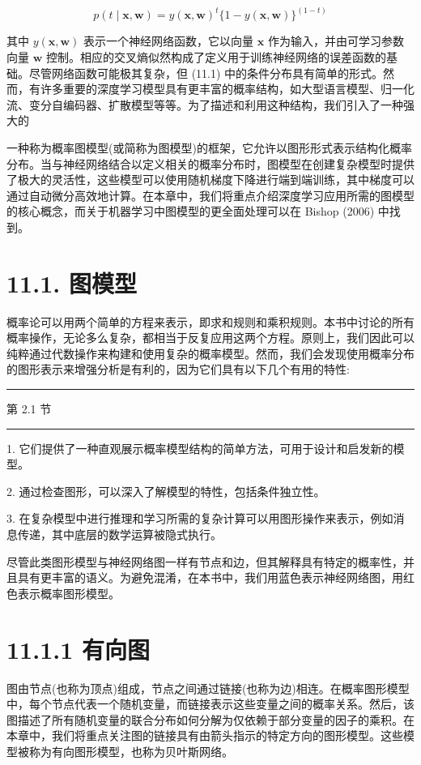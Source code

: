 \documentclass[10pt]{report}
\newcommand{\HRule}{\begin{center}\rule{0.9\linewidth}{0.2mm}\end{center}}
\begin{document}
\[
p\left( {t \mid  \mathbf{x},\mathbf{w}}\right)  = y{\left( \mathbf{x},\mathbf{w}\right) }^{t}\{ 1 - y\left( {\mathbf{x},\mathbf{w}}\right) {\} }^{\left( 1 - t\right) } \tag{11.1}
\]

其中 \(y\left( {\mathbf{x},\mathbf{w}}\right)\) 表示一个神经网络函数，它以向量 \(\mathbf{x}\) 作为输入，并由可学习参数向量 \(\mathbf{w}\) 控制。相应的交叉熵似然构成了定义用于训练神经网络的误差函数的基础。尽管网络函数可能极其复杂，但 (11.1) 中的条件分布具有简单的形式。然而，有许多重要的深度学习模型具有更丰富的概率结构，如大型语言模型、归一化流、变分自编码器、扩散模型等等。为了描述和利用这种结构，我们引入了一种强大的

一种称为概率图模型(或简称为图模型)的框架，它允许以图形形式表示结构化概率分布。当与神经网络结合以定义相关的概率分布时，图模型在创建复杂模型时提供了极大的灵活性，这些模型可以使用随机梯度下降进行端到端训练，其中梯度可以通过自动微分高效地计算。在本章中，我们将重点介绍深度学习应用所需的图模型的核心概念，而关于机器学习中图模型的更全面处理可以在 Bishop (2006) 中找到。

\section*{11.1. 图模型}

概率论可以用两个简单的方程来表示，即求和规则和乘积规则。本书中讨论的所有概率操作，无论多么复杂，都相当于反复应用这两个方程。原则上，我们因此可以纯粹通过代数操作来构建和使用复杂的概率模型。然而，我们会发现使用概率分布的图形表示来增强分析是有利的，因为它们具有以下几个有用的特性:

\HRule

第 2.1 节

\HRule

1. 它们提供了一种直观展示概率模型结构的简单方法，可用于设计和启发新的模型。

2. 通过检查图形，可以深入了解模型的特性，包括条件独立性。

3. 在复杂模型中进行推理和学习所需的复杂计算可以用图形操作来表示，例如消息传递，其中底层的数学运算被隐式执行。

尽管此类图形模型与神经网络图一样有节点和边，但其解释具有特定的概率性，并且具有更丰富的语义。为避免混淆，在本书中，我们用蓝色表示神经网络图，用红色表示概率图形模型。

\section*{11.1.1 有向图}

图由节点(也称为顶点)组成，节点之间通过链接(也称为边)相连。在概率图形模型中，每个节点代表一个随机变量，而链接表示这些变量之间的概率关系。然后，该图描述了所有随机变量的联合分布如何分解为仅依赖于部分变量的因子的乘积。在本章中，我们将重点关注图的链接具有由箭头指示的特定方向的图形模型。这些模型被称为有向图形模型，也称为贝叶斯网络。
\end{document}
